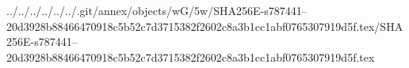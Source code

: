 ../../../../../../.git/annex/objects/wG/5w/SHA256E-s787441--20d3928b88466470918c5b52c7d3715382f2602c8a3b1cc1abf0765307919d5f.tex/SHA256E-s787441--20d3928b88466470918c5b52c7d3715382f2602c8a3b1cc1abf0765307919d5f.tex